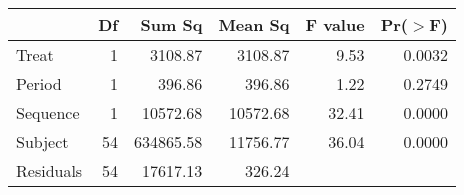 \begin{table}[ht]
\centering
\begin{tabular}{lrrrrr}
  \hline
 & Df & Sum Sq & Mean Sq & F value & Pr($>$F) \\ 
  \hline
Treat & 1 & 3108.87 & 3108.87 & 9.53 & 0.0032 \\ 
  Period & 1 & 396.86 & 396.86 & 1.22 & 0.2749 \\ 
  Sequence & 1 & 10572.68 & 10572.68 & 32.41 & 0.0000 \\ 
  Subject & 54 & 634865.58 & 11756.77 & 36.04 & 0.0000 \\ 
  Residuals & 54 & 17617.13 & 326.24 &  &  \\ 
   \hline
\end{tabular}
\label{anovatable}
\end{table}


